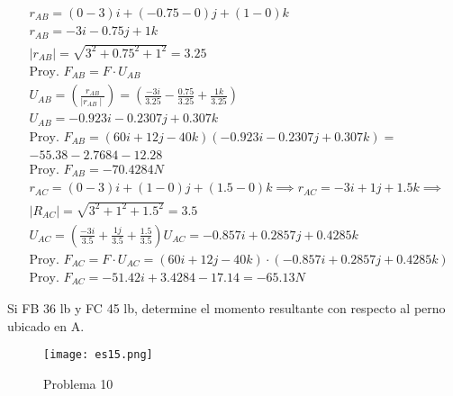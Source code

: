 \begin{align*}
	 & r_{AB}=(0-3)i+(-0.75-0)j+(1-0)k                                                                                    \\
	 & r_{AB}=-3i-0.75j+1k                                                                                                \\
	 & \mid r_{AB}\mid =\sqrt{3^2+0.75^2+1^2}=3.25                                                                        \\
	 & \text{Proy. } F_{AB}=F\cdot U_{AB}                                                                                 \\
	 & U_{AB}=\left(\frac{r_{AB}}{\mid r_{AB}\mid}\right)=\left(\frac{-3i}{3.25}-\frac{0.75}{3.25}+\frac{1k}{3.25}\right) \\
	 & U_{AB}=-0.923i-0.2307j+0.307k                                                                                      \\
	 & \text{Proy. }F_{AB}=(60i+12j-40k)(-0.923i-0.2307j+0.307k)=                                                         \\
	 & -55.38-2.7684-12.28                                                                                                \\
	 & \text{Proy. }F_{AB}=-70.4284N                                                                                      \\
	 & r_{AC}=(0-3)i+(1-0)j+(1.5-0)k\implies r_{AC}=-3i+1j+1.5k\implies                                                   \\
	 & \mid R_{AC}\mid =\sqrt{3^2+1^2+1.5^2}=3.5                                                                          \\
	 & U_{AC}=\left(\frac{-3i}{3.5}+\frac{1j}{3.5}+\frac{1.5}{3.5}\right)U_{AC}=-0.857i+0.2857j+0.4285k                   \\
	 & \text{Proy. }F_{AC}=F\cdot U_{AC}=(60i+12j-40k)\cdot(-0.857i+0.2857j+0.4285k)                                      \\
	 & \text{Proy. }F_{AC}=-51.42i+3.4284-17.14=-65.13N
\end{align*}


\begin{problem}
Si FB 36 lb y FC 45 lb, determine el momento resultante con respecto al perno ubicado en A.
\end{problem}

\begin{figure}[h!]
	\centering
	\texttt{[image: es15.png]}
	\caption{Problema 10}
\end{figure}

